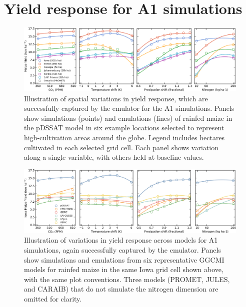 \documentclass[10pt]{article}
\begin{document}
{{\section{Yield response for A1 simulations}
\begin{figure}[h!]
\centering
    \includegraphics[width=16.3cm]{regression_exampleA1.png}
    \caption{
    Illustration of spatial variations in yield response, which are successfully captured by the emulator for the A1 simulations. 
    Panels show simulations (points) and emulations (lines) of rainfed maize in the pDSSAT model in six example locations selected to represent high-cultivation areas around the globe. 
    Legend includes hectares cultivated in each selected grid cell. 
    Each panel shows variation along a single variable, with others held at baseline values. 
    }
   \label{fig:regression}
\end{figure}

\begin{figure}[h!]
\centering
    \includegraphics[width=16.3cm]{regression_exampleA1_2.png}
    \caption{
    Illustration of variations in yield response across models for A1 simulations, again successfully captured by the emulator. 
    Panels show simulations and emulations from six representative GGCMI models for rainfed maize in the same Iowa grid cell shown above, with the same plot conventions. 
    Three models (PROMET, JULES, and CARAIB) that do not simulate the nitrogen dimension are omitted for clarity. 
    }
   \label{fig:regression_2}
\end{figure}


}}
\end{document}
